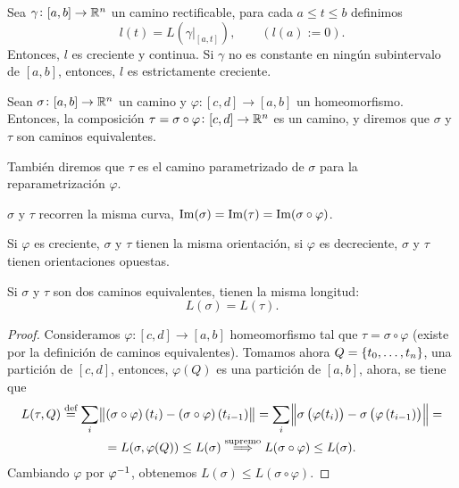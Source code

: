 \begin{prop}
    Sea $\gamma \colon [a,b] \to \mathbb{R}^n$ un camino rectificable, para cada $a \leq t \leq b$ definimos
    \[
        l(t) = L\left( \gamma\vert_{[a,t]} \right), \qquad (l(a) := 0).
    \]
    Entonces, $l$ es creciente y continua. Si $\gamma$ no es constante en ningún subintervalo de $[a,b]$,
    entonces, $l$ es estrictamente creciente.
\end{prop}

\begin{defi}
    Sean $\sigma \colon [a, b] \to \mathbb{R}^n$ un camino y $\varphi \colon [c, d] \to [a, b]$ un homeomorfismo. Entonces,
    la composición $\tau = \sigma \circ \varphi \colon [c,d] \to \mathbb{R}^n$ es un camino, y diremos que $\sigma$ y $\tau$
    son caminos equivalentes.

    Tambi\'en diremos que $\tau$ es el camino parametrizado de $\sigma$ para la reparametrización $\varphi$.
\end{defi}

\begin{obs}
    $\sigma$ y $\tau$ recorren la misma curva, $\operatorname{Im}(\sigma) = \operatorname{Im}(\tau) = \operatorname{Im}(\sigma \circ \varphi)$.
\end{obs}

\begin{obs}
    Si $\varphi$ es creciente, $\sigma$ y $\tau$ tienen la misma orientación, si $\varphi$ es decreciente,
    $\sigma$ y $\tau$ tienen orientaciones opuestas.
\end{obs}

\begin{prop}
    Si $\sigma$ y $\tau$ son dos caminos equivalentes, tienen la misma longitud:
    \[
        L(\sigma) = L(\tau).
    \]
\end{prop}

\begin{proof}
    Consideramos $\varphi \colon [c, d] \to [a, b]$ homeomorfismo tal que $\tau = \sigma \circ \varphi$
    (existe por la definición de caminos equivalentes). Tomamos ahora $Q = \left\{t_0, \dots, t_n\right\}$, una partición de $[c, d]$,
    entonces, $\varphi(Q)$ es una partición de $[a,b]$, ahora, se tiene que
    \begin{gather*}
        L(\tau, Q) \stackrel{\text{def}}{=} \sum_i \norm{(\sigma \circ \varphi) \left( t_i \right) - (\sigma \circ \varphi)\left( t_{i-1} \right)}
        = \sum_i \norm{\sigma\left( \varphi(t_i) \right) - \sigma\left( \varphi\left( t_{i-1} \right) \right)} = \\ =
        L(\sigma, \varphi(Q)) \leq L(\sigma) \stackrel{\text{supremo}}{\implies} L(\sigma \circ \varphi) \leq L(\sigma).
    \end{gather*}
    Cambiando $\varphi$ por $\varphi^{-1}$, obtenemos $L(\sigma) \leq L(\sigma \circ \varphi)$.
\end{proof}

